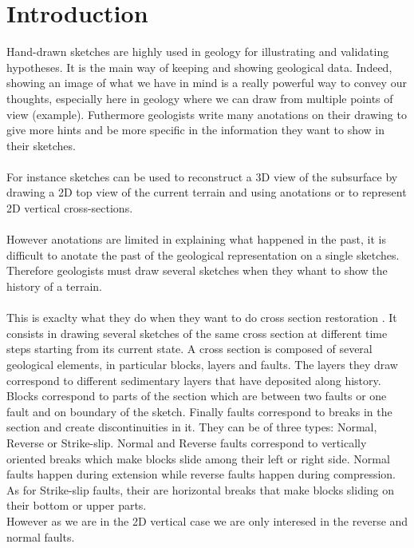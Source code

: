 \documentclass[12pt, a4paper]{memoir} %
\begin{document}
\chapter{Introduction}

Hand-drawn sketches are highly used in geology for illustrating and validating hypotheses. It is the main way of keeping and showing geological data. Indeed, showing an image of what we have in mind is a really powerful way to convey our thoughts, especially here in geology where we can draw from multiple points of view (example). Futhermore geologists write many anotations on their drawing to give more hints and be more specific in the information they want to show in their sketches.\\\\
For instance sketches can be used to reconstruct a 3D view of the subsurface by drawing a 2D top view of the current terrain \cite{brazil} and using anotations or to represent 2D vertical cross-sections. \\\\
However anotations are limited in explaining what happened in the past, it is difficult to anotate the past of the geological representation on a single sketches. Therefore geologists must draw several sketches when they whant to show the history of a terrain. \\\\
This is exaclty what they do when they want to do cross section restoration \cite{SectionRestoration}. It consists in drawing several sketches of the same cross section at different time steps starting from its current state. A cross section is composed of several geological elements, in particular blocks, layers and faults. The layers they draw correspond to different sedimentary layers that have deposited  along history. Blocks correspond to parts of the section which are between two faults or one fault and on boundary of the sketch. Finally faults correspond to breaks in the section and create discontinuities in it. They can be of three types:
Normal, Reverse or Strike-slip. Normal and Reverse faults correspond to vertically oriented breaks which make blocks slide among their left or right side. Normal faults happen during extension while reverse faults happen during compression. As for Strike-slip faults, their are horizontal breaks that make blocks sliding on their bottom or upper parts.\\
However as we are in the 2D vertical case we are only interesed in the reverse and normal faults.\\\\
\end{document}
